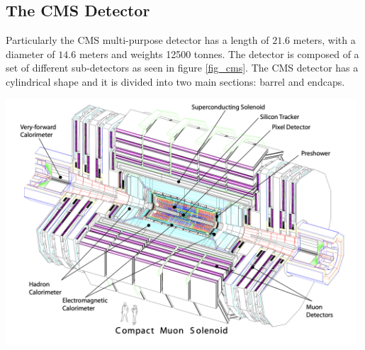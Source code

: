 \subsection{The CMS Detector}
Particularly the CMS multi-purpose detector has a length of $21.6$ meters, with a diameter of $14.6$ meters and weights 12500 tonnes. The detector is composed of a set of different sub-detectors as seen in figure \ref{fig_cms}. The CMS detector has a cylindrical shape and it is divided into two main sections: barrel and endcaps. 

\begin{center}
	\includegraphics[width=0.98\textwidth]{Images/CMS.png}
	\label{fig_cms}
\end{center}


